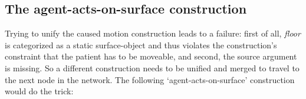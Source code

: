 \subsection{The agent-acts-on-surface construction}

Trying to unify the caused motion construction leads to a failure: first of all, {\em floor} is categorized as a static surface-object and thus violates the construction's constraint that the patient has to be moveable, and second, the source argument is missing. So a different construction needs to be unified and merged to travel to the next node in the network. The following `agent-acts-on-surface' construction would do the trick:

\newpage
